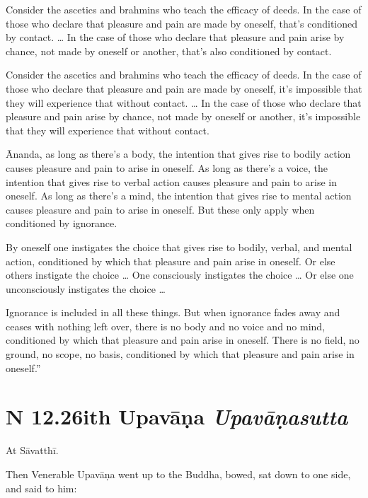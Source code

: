 \documentclass[12pt,openany]{book}%
\newcommand*{\suttatitleacronym}[1]{\smaller[2]{#1}\vspace*{.3em}}
\newcommand*{\suttatitletranslation}[1]{\linebreak{#1}}
\newcommand*{\suttatitleroot}[1]{\linebreak\smaller[2]\itshape{#1}}
\newcommand*{\tocacronym}[1]{\hspace*{-3.3em}{#1}\quad}
\newcommand*{\toctranslation}[1]{#1}
\newcommand*{\tocroot}[1]{(\textit{#1})}
\begin{document}
Consider the ascetics and brahmins who teach the efficacy of deeds. In the case of those who declare that pleasure and pain are made by oneself, that’s conditioned by contact. … In the case of those who declare that pleasure and pain arise by chance, not made by oneself or another, that’s also conditioned by contact. 

Consider the ascetics and brahmins who teach the efficacy of deeds. In the case of those who declare that pleasure and pain are made by oneself, it’s impossible that they will experience that without contact. … In the case of those who declare that pleasure and pain arise by chance, not made by oneself or another, it’s impossible that they will experience that without contact. 

Ānanda, as long as there’s a body, the intention that gives rise to bodily action causes pleasure and pain to arise in oneself. As long as there’s a voice, the intention that gives rise to verbal action causes pleasure and pain to arise in oneself. As long as there’s a mind, the intention that gives rise to mental action causes pleasure and pain to arise in oneself. But these only apply when conditioned by ignorance. 

By oneself one instigates the choice that gives rise to bodily, verbal, and mental action, conditioned by which that pleasure and pain arise in oneself. Or else others instigate the choice … One consciously instigates the choice … Or else one unconsciously instigates the choice … 

Ignorance is included in all these things. But when ignorance fades away and ceases with nothing left over, there is no body and no voice and no mind, conditioned by which that pleasure and pain arise in oneself. There is no field, no ground, no scope, no basis, conditioned by which that pleasure and pain arise in oneself.” 

%
\section*{{\suttatitleacronym SN 12.26}{\suttatitletranslation With Upavāṇa }{\suttatitleroot Upavāṇasutta}}
\addcontentsline{toc}{section}{\tocacronym{SN 12.26} \toctranslation{With Upavāṇa } \tocroot{Upavāṇasutta}}

At \textsanskrit{Sāvatthī}. 

Then Venerable \textsanskrit{Upavāṇa} went up to the Buddha, bowed, sat down to one side, and said to him: 
\end{document}
